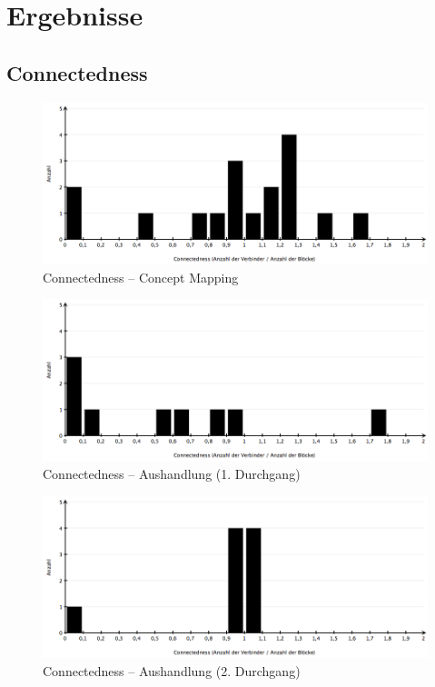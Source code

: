 
\section{Ergebnisse} %
\label{sec:m_ergebnisse}


\subsection{Connectedness} %
\label{sub:connectedness}

\begin{figure}[htbp]
	\centering
		\includegraphics[width=12cm]{img/Evaluierung/connectednessConceptMapping.png}
	\caption{Connectedness -- Concept Mapping}
	\label{fig:img_Evaluierung_connectednessConceptMapping}
\end{figure}

\begin{figure}[htbp]
	\centering
		\includegraphics[width=12cm]{img/Evaluierung/connectednessAushandlung1.png}
	\caption{Connectedness -- Aushandlung (1. Durchgang)}
	\label{fig:img_Evaluierung_connectednessAushandlung1}
\end{figure}

\begin{figure}[htbp]
	\centering
		\includegraphics[width=12cm]{img/Evaluierung/connectednessAushandlung2.png}
	\caption{Connectedness -- Aushandlung (2. Durchgang)}
	\label{fig:img_Evaluierung_connectednessAushandlung2}
\end{figure}


